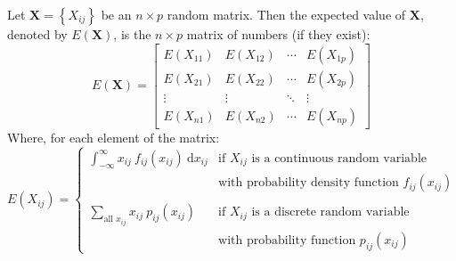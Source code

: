 \documentclass[a4paper]{article}
\newcommand{\highspace}{\vspace{1.2em}\noindent}
\begin{document}
    \highspace
    Let $\mathbf{X} = \left\{X_{ij}\right\}$ be an $n \times p$ random matrix. Then the expected value of $\mathbf{X}$, denoted by $E\left(\mathbf{X}\right)$, is the $n \times p$ matrix of numbers (if they exist):
    \begin{equation}\label{eq: random vectors and matrices}
        E\left(\mathbf{X}\right) = \begin{bmatrix}
            E\left(X_{11}\right) & E\left(X_{12}\right) & \cdots & E\left(X_{1p}\right) \\ 
            E\left(X_{21}\right) & E\left(X_{22}\right) & \cdots & E\left(X_{2p}\right) \\ 
            \vdots               & \vdots               & \ddots & \vdots               \\ 
            E\left(X_{n1}\right) & E\left(X_{n2}\right) & \cdots & E\left(X_{np}\right)
        \end{bmatrix}
    \end{equation}
    Where, for each element of the matrix:
    \begin{equation*}
        E\left(X_{ij}\right) = \begin{cases}
            \displaystyle \int_{-\infty}^{\infty} x_{ij} \: f_{ij}\left(x_{ij}\right) \:\mathrm{d}x_{ij} & \text{if }X_{ij}\text{ is a continuous random variable} \\
            & \text{with probability density function }f_{ij}\left(x_{ij}\right) \\
            \\
            \displaystyle \sum_{\text{all }x_{ij}} x_{ij} \: p_{ij} \left(x_{ij}\right) & \text{if }X_{ij}\text{ is a discrete random variable} \\
            & \text{with probability function }p_{ij}\left(x_{ij}\right)
        \end{cases}
    \end{equation*}
\end{document}

